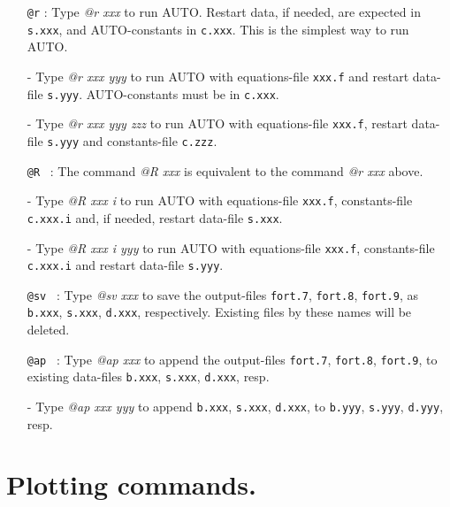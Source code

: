 \documentclass[12pt]{report}
\begin{document}
\begin{itemize}
\item[\tt @r]:
  Type {\it @r xxx} to run {\cal AUTO}.
  Restart data, if needed, are expected in {\tt s.xxx},
  and {\cal AUTO}-constants in {\tt c.xxx}.
  This is the simplest way to run {\cal AUTO}.
\item[-]
  Type {\it @r xxx yyy} to run {\cal AUTO}
  with equations-file {\tt xxx.f} and restart data-file {\tt s.yyy}.
  {\cal AUTO}-constants must be in {\tt c.xxx}.
\item[-]
  Type {\it @r xxx yyy zzz} to run {\cal AUTO}
  with equations-file {\tt xxx.f}, restart data-file {\tt s.yyy}
  and constants-file {\tt c.zzz}.

\item[\tt @R]~:
  The command {\it @R xxx} is equivalent to the command {\it @r xxx} above.
\item[-]
  Type {\it @R xxx i}  to run {\cal AUTO} with equations-file {\tt xxx.f},
  constants-file {\tt c.xxx.i}
  and, if needed, restart data-file {\tt s.xxx}. 
\item[-]
  Type {\it @R xxx i yyy} to run {\cal AUTO}
  with equations-file {\tt xxx.f}, 
  constants-file {\tt c.xxx.i}
  and restart data-file {\tt s.yyy}.

\item[\tt @sv]~:
  Type {\it @sv xxx} to save the output-files 
  {\tt fort.7}, {\tt fort.8}, {\tt fort.9},
  as {\tt b.xxx}, {\tt s.xxx}, {\tt d.xxx}, respectively.
  Existing files by these names will be deleted.

\item[\tt @ap]~:
  Type {\it @ap xxx} to append the output-files 
  {\tt fort.7}, {\tt fort.8}, {\tt fort.9}, 
  to existing data-files 
  {\tt b.xxx}, {\tt s.xxx}, {\tt d.xxx}, resp.
\item[-]
  Type {\it @ap xxx yyy} 
  to append 
  {\tt b.xxx}, {\tt s.xxx}, {\tt d.xxx}, to
  {\tt b.yyy}, {\tt s.yyy}, {\tt d.yyy}, resp.
\end{itemize}

\section{ Plotting commands.} 
\end{document}
